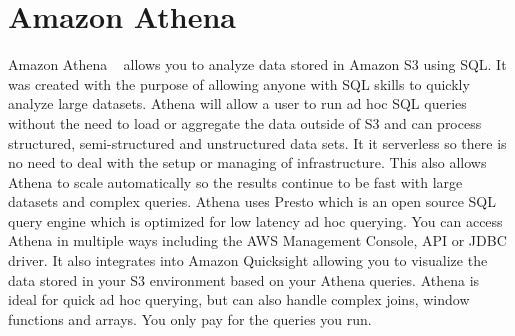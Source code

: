 \section{Amazon Athena}

Amazon Athena ~\cite{hid-sp18-521-athena-faq} allows you to analyze data
stored in Amazon S3 using SQL. It was created with the purpose of
allowing anyone with SQL skills to quickly analyze large datasets.
Athena will allow a user to run ad hoc SQL queries without the need to
load or aggregate the data outside of S3 and can process structured,
semi-structured and unstructured data sets. It it serverless so there
is no need to deal with the setup or managing of infrastructure. This
also allows Athena to scale automatically so the results continue to
be fast with large datasets and complex queries. Athena uses Presto
which is an open source SQL query engine which is optimized for low
latency ad hoc querying. You can access Athena in multiple ways
including the AWS Management Console, API or JDBC driver. It also
integrates into Amazon Quicksight allowing you to visualize the data
stored in your S3 environment based on your Athena queries. Athena is
ideal for quick ad hoc querying, but can also handle complex joins,
window functions and arrays. You only pay for the queries you run.
